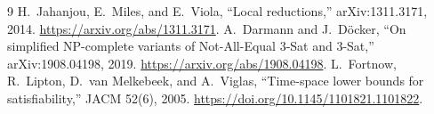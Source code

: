 \documentclass[11pt]{article}
\begin{document}
\begin{thebibliography}{9}
H.~Jahanjou, E.~Miles, and E.~Viola,
``Local reductions,'' arXiv:1311.3171, 2014.
\url{https://arxiv.org/abs/1311.3171}.
A.~Darmann and J.~D\"ocker,
``On simplified NP-complete variants of Not-All-Equal 3-Sat and 3-Sat,''
arXiv:1908.04198, 2019.
\url{https://arxiv.org/abs/1908.04198}.
L.~Fortnow, R.~Lipton, D.~van Melkebeek, and A.~Viglas,
``Time-space lower bounds for satisfiability,'' JACM 52(6), 2005.
\url{https://doi.org/10.1145/1101821.1101822}.
\end{thebibliography}

\end{document}
